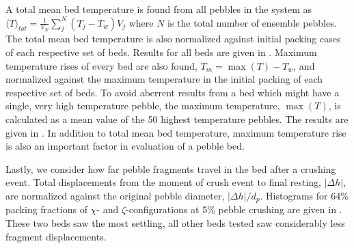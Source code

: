 A total mean bed temperature is found from all pebbles in the system as $\langle T\rangle_{tot} = \frac{1}{V_N}\sum_{j}^N (T_j-T_w) V_j$ where $N$ is the total number of ensemble pebbles. The total mean bed temperature is also normalized against initial packing cases of each respective set of beds. Results for all beds are given in . Maximum temperature rises of every bed are also found, $T_m = \max(T) - T_w$, and normalized against the maximum temperature in the initial packing of each respective set of beds. To avoid aberrent results from a bed which might have a single, very high temperature pebble, the maximum temperature, $\max(T)$, is calculated as a mean value of the 50 highest temperature pebbles. The results are given in . In addition to total mean bed temperature, maximum temperature rise is also an important factor in evaluation of a pebble bed.

Lastly, we consider how far pebble fragments travel in the bed after a crushing event. Total displacements from the moment of crush event to final resting, $|\Delta h|$, are normalized against the original pebble diameter, $|\Delta h|/d_p$. Histograms for 64\% packing fractions of $\chi$- and $\zeta$-configurations at 5\% pebble crushing are given in . These two beds saw the most settling, all other beds tested saw considerably less fragment displacements.









